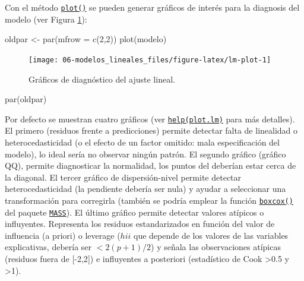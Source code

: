 \documentclass[
]{book}
\newenvironment{Shaded}{\begin{snugshade}}{\end{snugshade}}
\newcommand{\AttributeTok}[1]{\textcolor[rgb]{0.77,0.63,0.00}{#1}}
\newcommand{\DecValTok}[1]{\textcolor[rgb]{0.00,0.00,0.81}{#1}}
\newcommand{\FunctionTok}[1]{\textcolor[rgb]{0.00,0.00,0.00}{#1}}
\newcommand{\NormalTok}[1]{#1}
\newcommand{\OtherTok}[1]{\textcolor[rgb]{0.56,0.35,0.01}{#1}}
\theoremstyle{break}
\theoremstyle{nonumberplain}
\begin{document}
Con el método \href{https://rdrr.io/r/stats/plot.lm.html}{\texttt{plot()}} se pueden generar gráficos de interés para la diagnosis del modelo (ver Figura \ref{fig:lm-plot}):

\begin{Shaded}
\begin{Highlighting}[]
\NormalTok{oldpar }\OtherTok{\textless{}{-}} \FunctionTok{par}\NormalTok{(}\AttributeTok{mfrow =} \FunctionTok{c}\NormalTok{(}\DecValTok{2}\NormalTok{,}\DecValTok{2}\NormalTok{))}
\FunctionTok{plot}\NormalTok{(modelo)}
\end{Highlighting}
\end{Shaded}

\begin{figure}[!htb]

{\centering \texttt{[image: 06-modelos\_lineales\_files/figure-latex/lm-plot-1]} 

}

\caption{Gráficos de diagnóstico del ajuste lineal.}\label{fig:lm-plot}
\end{figure}

\begin{Shaded}
\begin{Highlighting}[]
\FunctionTok{par}\NormalTok{(oldpar)}
\end{Highlighting}
\end{Shaded}

Por defecto se muestran cuatro gráficos (ver \href{https://rdrr.io/r/stats/plot.lm.html}{\texttt{help(plot.lm)}} para más detalles).
El primero (residuos frente a predicciones) permite detectar falta de linealidad o heterocedasticidad (o el efecto de un factor omitido: mala especificación del modelo), lo ideal sería no observar ningún patrón.
El segundo gráfico (gráfico QQ), permite diagnosticar la normalidad, los puntos del deberían estar cerca de la diagonal.
El tercer gráfico de dispersión-nivel permite detectar heterocedasticidad (la pendiente debería ser nula) y ayudar a seleccionar una transformación para corregirla (también se podría emplear la función \href{https://rdrr.io/pkg/MASS/man/boxcox.html}{\texttt{boxcox()}} del paquete \href{https://CRAN.R-project.org/package=MASS}{\texttt{MASS}}).
El último gráfico permite detectar valores atípicos o influyentes. Representa los residuos estandarizados en función del valor de influencia (a priori) o leverage (\(hii\) que depende de los valores de las variables explicativas, debería ser \(< 2(p+1)/2\)) y señala las observaciones atípicas (residuos fuera de {[}-2,2{]}) e influyentes a posteriori (estadístico de Cook \textgreater0.5 y \textgreater1).
\end{document}
